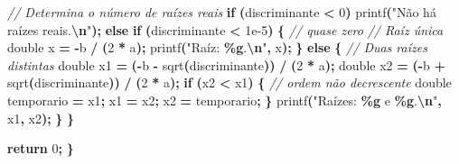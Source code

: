 \documentclass[
  11pt,
  a4paper,
]{scrbook}
\newenvironment{Shaded}{\begin{snugshade}}{\end{snugshade}}
\newcommand{\CommentTok}[1]{\textcolor[rgb]{0.56,0.35,0.01}{\textit{#1}}}
\newcommand{\ControlFlowTok}[1]{\textcolor[rgb]{0.13,0.29,0.53}{\textbf{#1}}}
\newcommand{\DataTypeTok}[1]{\textcolor[rgb]{0.13,0.29,0.53}{#1}}
\newcommand{\DecValTok}[1]{\textcolor[rgb]{0.00,0.00,0.81}{#1}}
\newcommand{\FloatTok}[1]{\textcolor[rgb]{0.00,0.00,0.81}{#1}}
\newcommand{\NormalTok}[1]{#1}
\newcommand{\OperatorTok}[1]{\textcolor[rgb]{0.81,0.36,0.00}{\textbf{#1}}}
\newcommand{\SpecialCharTok}[1]{\textcolor[rgb]{0.81,0.36,0.00}{\textbf{#1}}}
\newcommand{\StringTok}[1]{\textcolor[rgb]{0.31,0.60,0.02}{#1}}
\begin{document}
\begin{Shaded}
\begin{Highlighting}[]
        \CommentTok{// Determina o número de raízes reais}
        \ControlFlowTok{if} \OperatorTok{(}\NormalTok{discriminante }\OperatorTok{\textless{}} \DecValTok{0}\OperatorTok{)} 
\NormalTok{            printf}\OperatorTok{(}\StringTok{"Não há raízes reais.}\SpecialCharTok{\textbackslash{}n}\StringTok{"}\OperatorTok{);}
        \ControlFlowTok{else} \ControlFlowTok{if} \OperatorTok{(}\NormalTok{discriminante }\OperatorTok{\textless{}} \FloatTok{1e{-}5}\OperatorTok{)} \OperatorTok{\{}  \CommentTok{// quase zero}
            \CommentTok{// Raíz única}
            \DataTypeTok{double}\NormalTok{ x }\OperatorTok{=} \OperatorTok{{-}}\NormalTok{b }\OperatorTok{/} \OperatorTok{(}\DecValTok{2} \OperatorTok{*}\NormalTok{ a}\OperatorTok{);}
\NormalTok{            printf}\OperatorTok{(}\StringTok{"Raíz: }\SpecialCharTok{\%g}\StringTok{.}\SpecialCharTok{\textbackslash{}n}\StringTok{"}\OperatorTok{,}\NormalTok{ x}\OperatorTok{);}
                                       \OperatorTok{\}}
        \ControlFlowTok{else} \OperatorTok{\{}
            \CommentTok{// Duas raízes distintas}
            \DataTypeTok{double}\NormalTok{ x1 }\OperatorTok{=} \OperatorTok{({-}}\NormalTok{b }\OperatorTok{{-}}\NormalTok{ sqrt}\OperatorTok{(}\NormalTok{discriminante}\OperatorTok{))} \OperatorTok{/} \OperatorTok{(}\DecValTok{2} \OperatorTok{*}\NormalTok{ a}\OperatorTok{);}
            \DataTypeTok{double}\NormalTok{ x2 }\OperatorTok{=} \OperatorTok{({-}}\NormalTok{b }\OperatorTok{+}\NormalTok{ sqrt}\OperatorTok{(}\NormalTok{discriminante}\OperatorTok{))} \OperatorTok{/} \OperatorTok{(}\DecValTok{2} \OperatorTok{*}\NormalTok{ a}\OperatorTok{);}
            \ControlFlowTok{if} \OperatorTok{(}\NormalTok{x2 }\OperatorTok{\textless{}}\NormalTok{ x1}\OperatorTok{)} \OperatorTok{\{} \CommentTok{// ordem não decrescente}
                \DataTypeTok{double}\NormalTok{ temporario }\OperatorTok{=}\NormalTok{ x1}\OperatorTok{;}
\NormalTok{                x1 }\OperatorTok{=}\NormalTok{ x2}\OperatorTok{;}
\NormalTok{                x2 }\OperatorTok{=}\NormalTok{ temporario}\OperatorTok{;}
                         \OperatorTok{\}}
\NormalTok{            printf}\OperatorTok{(}\StringTok{"Raízes: }\SpecialCharTok{\%g}\StringTok{ e }\SpecialCharTok{\%g}\StringTok{.}\SpecialCharTok{\textbackslash{}n}\StringTok{"}\OperatorTok{,}\NormalTok{ x1}\OperatorTok{,}\NormalTok{ x2}\OperatorTok{);}
             \OperatorTok{\}}
         \OperatorTok{\}}

    \ControlFlowTok{return} \DecValTok{0}\OperatorTok{;}
               \OperatorTok{\}}
\end{Highlighting}
\end{Shaded}
\end{document}
